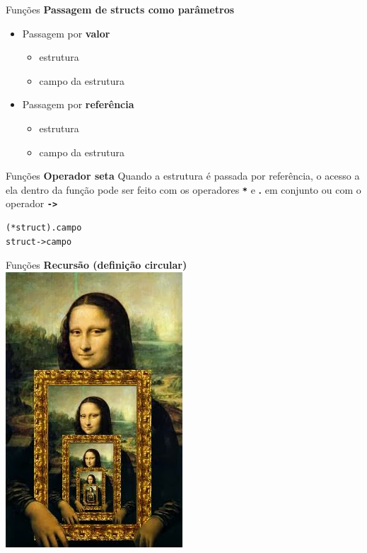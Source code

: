 \documentclass[10pt]{beamer}
\begin{document}
\begin{frame}{Funções}
  \huge
  \textbf{Passagem de structs como parâmetros}
  \vfill
  \Large
  \begin{itemize}
    \item Passagem por \textbf{valor}

    \begin{itemize}
      \Large
      \item estrutura
      \item campo da estrutura
    \end{itemize}
    \item Passagem por \textbf{referência}

    \begin{itemize}
      \Large
      \item estrutura
      \item campo da estrutura
    \end{itemize}
  \end{itemize}
\end{frame}

\begin{frame}[fragile]{Funções}
  \huge
  \textbf{Operador seta}
  \vfill
  \large
  Quando a estrutura é passada por referência, o acesso a ela dentro da função pode ser feito com os operadores \textbf{\texttt{*}} e \textbf{.} em conjunto ou com o operador \textbf{\texttt{->}}
  \vfill
  \large
  \begin{verbatim}
(*struct).campo
struct->campo
  \end{verbatim}
\end{frame}

\begin{frame}{Funções}
  \huge
  \textbf{Recursão (definição circular)}
  \vfill
  \centering
  \includegraphics[height=.7\textheight]{images/recursao.jpg}
\end{frame}
\end{document}
